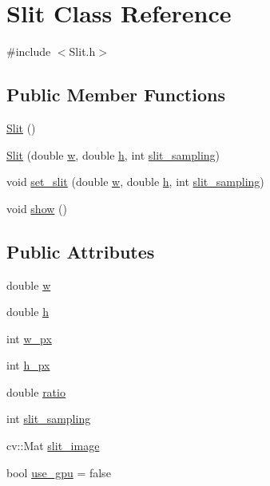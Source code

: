 \hypertarget{class_slit}{}\section{Slit Class Reference}
\label{class_slit}


{\ttfamily \#include $<$Slit.\+h$>$}

\subsection*{Public Member Functions}
\begin{DoxyCompactItemize}
\item 
\hyperlink{class_slit_a64e4cabe34422a95f11ecc0069347b16}{Slit} ()
\item 
\hyperlink{class_slit_ace3c25bd92a26fc1e90e7e97525f3c90}{Slit} (double \hyperlink{class_slit_ae33a1c4c7205343947d2d3efdfdbd1dc}{w}, double \hyperlink{class_slit_a01efae646d51d27448701f31bd0d93dd}{h}, int \hyperlink{class_slit_ad5af377fe458ceb5c391be67ee58ac7b}{slit\+\_\+sampling})
\item 
void \hyperlink{class_slit_ad284e68cbdc279e58a6fd15dae919b90}{set\+\_\+slit} (double \hyperlink{class_slit_ae33a1c4c7205343947d2d3efdfdbd1dc}{w}, double \hyperlink{class_slit_a01efae646d51d27448701f31bd0d93dd}{h}, int \hyperlink{class_slit_ad5af377fe458ceb5c391be67ee58ac7b}{slit\+\_\+sampling})
\item 
void \hyperlink{class_slit_aea877be5c12b83fe5a50ee95ac2935db}{show} ()
\end{DoxyCompactItemize}
\subsection*{Public Attributes}
\begin{DoxyCompactItemize}
\item 
double \hyperlink{class_slit_ae33a1c4c7205343947d2d3efdfdbd1dc}{w}
\item 
double \hyperlink{class_slit_a01efae646d51d27448701f31bd0d93dd}{h}
\item 
int \hyperlink{class_slit_ae6998ed65fc4b82946152b723786fc6c}{w\+\_\+px}
\item 
int \hyperlink{class_slit_a1111ee8f26d476bcf047225ed8cd30e5}{h\+\_\+px}
\item 
double \hyperlink{class_slit_a28fd1dfc764c0cb46b40c5370708e4ff}{ratio}
\item 
int \hyperlink{class_slit_ad5af377fe458ceb5c391be67ee58ac7b}{slit\+\_\+sampling}
\item 
cv\+::\+Mat \hyperlink{class_slit_a3413479f87256e54dbd0a517b36f26e9}{slit\+\_\+image}
\item 
bool \hyperlink{class_slit_af27ddf455c96b348f6b0f5c221e41b20}{use\+\_\+gpu} = false
\end{DoxyCompactItemize}


